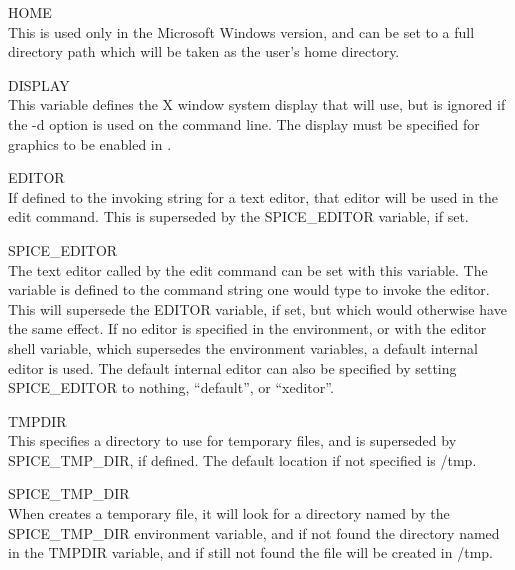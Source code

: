 \begin{description}
\raggedright
{}
\item{\et HOME}\\
This is used only in the Microsoft Windows version, and can be set to
a full directory path which will be taken as the user's home
directory.

\item{\et DISPLAY}\\
This variable defines the X window system display that {\WRspice} will
use, but is ignored if the {\vt -d} option is used on the {\WRspice}
command line.  The display must be specified for graphics to be
enabled in {\WRspice}.

\item{\et EDITOR}\\
If defined to the invoking string for a text editor, that editor will
be used in the {\cb edit} command.  This is superseded by the {\et
SPICE\_EDITOR} variable, if set.

\item{\et SPICE\_EDITOR}\\
The text editor called by the {\cb edit} command can be set with this
variable.  The variable is defined to the command string one would
type to invoke the editor.  This will supersede the {\et EDITOR}
variable, if set, but which would otherwise have the same effect.  If
no editor is specified in the environment, or with the {\et editor}
shell variable, which supersedes the environment variables, a default
internal editor is used.  The default internal editor can also be
specified by setting {\et SPICE\_EDITOR} to nothing, ``{\vt default}'',
or ``{\vt xeditor}''.

\item{\et TMPDIR}\\
This specifies a directory to use for temporary files, and is
superseded by {\et SPICE\_TMP\_DIR}, if defined.  The default location
if not specified is {\vt /tmp}.

\item{\et SPICE\_TMP\_DIR}\\
When {\WRspice} creates a temporary file, it will look for a directory named
by the {\et SPICE\_TMP\_DIR} environment variable, and if not found the
directory named in the {\et TMPDIR} variable, and if still not found
the file will be created in {\vt /tmp}.


\end{description}
